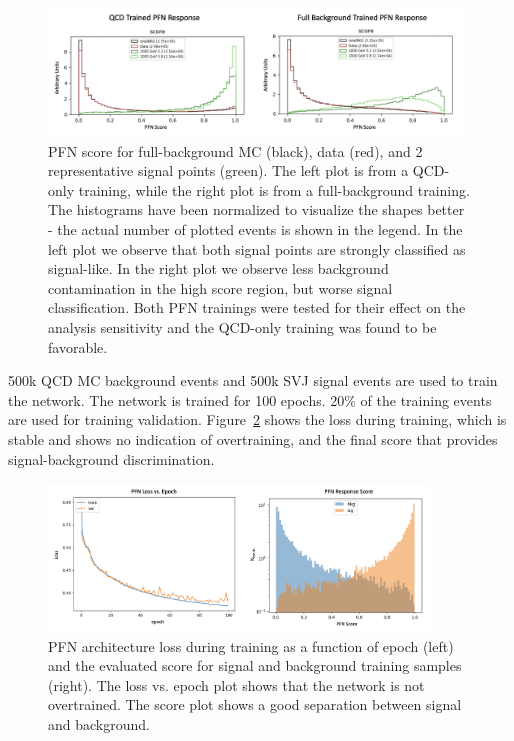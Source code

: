 \begin{figure}[!htbp]
\centering
   \includegraphics[width=0.98\textwidth]{figures/ml/pfn_MC_training_mixture}
    \caption{PFN score for full-background MC (black), data (red), and 2 representative signal points (green). The left plot is from a QCD-only training, while the right plot is from a full-background training. The histograms have been normalized to visualize the shapes better - the actual number of plotted events is shown in the legend. In the left plot we observe that both signal points are strongly classified as signal-like. In the right plot we observe less background contamination in the high score region, but worse signal classification. Both PFN trainings were tested for their effect on the analysis sensitivity and the QCD-only training was found to be favorable. 
    \label{fig:pfn_MC_training_mixture}}
\end{figure}

500k QCD MC background events and 500k SVJ signal events are used to train the network. The network is trained for 100 epochs. 20\% of the training events are used for training validation. Figure~\ref{fig:pfn_loss} shows the loss during training, which is stable and shows no indication of overtraining, and the final score that provides signal-background discrimination.

\begin{figure}[!htbp]
\centering
   \includegraphics[width=0.9\textwidth]{figures/ml/pfn_loss_score}    
    \caption{PFN architecture loss during training as a function of epoch (left) and the evaluated score for signal and background training samples (right). The loss vs. epoch plot shows that the network is not overtrained. The score plot shows a good separation between signal and background.
    \label{fig:pfn_loss}}
\end{figure}

